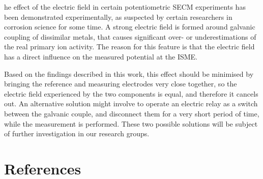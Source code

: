 \documentclass[3p]{elsarticle}
\begin{document}
he effect of the electric field in certain potentiometric SECM experiments has been demonstrated experimentally, as suspected by certain researchers in corrosion science for some time. A strong electric field is formed around galvanic coupling of dissimilar metals, that causes significant over- or underestimations of the real primary ion activity. The reason for this feature is that the electric field has a direct influence on the measured potential at the ISME.

Based on the findings described in this work, this effect should be minimised by bringing the reference and measuring electrodes very close together, so the electric field experienced by the two components is equal, and therefore it cancels out. An alternative solution might involve to operate an electric relay as a switch between the galvanic couple, and disconnect them for a very short period of time, while the measurement is performed. These two possible solutions will be subject of further investigation in our research groups.


\section*{References}
\end{document}
